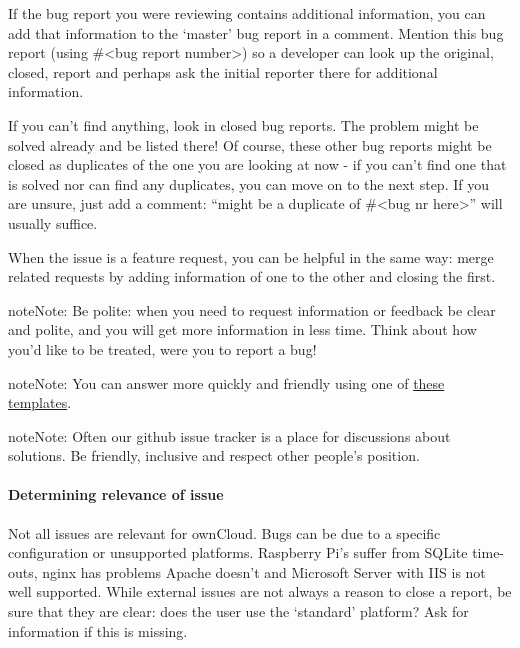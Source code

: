 \documentclass[letterpaper,10pt,english]{sphinxmanual}
\begin{document}
If the bug report you were reviewing contains additional information, you can add that information to the `master' bug report in a comment. Mention this bug report (using \#\textless{}bug report number\textgreater{}) so a developer can look up the original, closed, report and perhaps ask the initial reporter there for additional information.

If you can't find anything, look in closed bug reports. The problem might be solved already and be listed there! Of course, these other bug reports might be closed as duplicates of the one you are looking at now - if you can't find one that is solved nor can find any duplicates, you can move on to the next step. If you are unsure, just add a comment: ``might be a duplicate of \#\textless{}bug nr here\textgreater{}'' will usually suffice.

When the issue is a feature request, you can be helpful in the same way: merge related requests by adding information of one to the other and closing the first.

\begin{notice}{note}{Note:}
Be polite: when you need to request information or feedback be clear and polite, and you will get more information in less time. Think about how you'd like to be treated, were you to report a bug!
\end{notice}

\begin{notice}{note}{Note:}
You can answer more quickly and friendly using one of \href{https://gist.github.com/jancborchardt/6155185\#clean-up-inactive-issues}{these templates}.
\end{notice}

\begin{notice}{note}{Note:}
Often our github issue tracker is a place for discussions about solutions. Be friendly, inclusive and respect other people's position.
\end{notice}


\paragraph{Determining relevance of issue}
\label{bugtracker/triaging:determining-relevance-of-issue}
Not all issues are relevant for ownCloud. Bugs can be due to a specific configuration or unsupported platforms. Raspberry Pi's suffer from SQLite time-outs, nginx has problems Apache doesn't and Microsoft Server with IIS is not well supported. While external issues are not always a reason to close a report, be sure that they are clear: does the user use the `standard' platform? Ask for information if this is missing.
\end{document}
